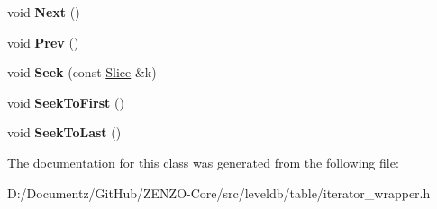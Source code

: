 \begin{DoxyCompactItemize}
\item 
\mbox{\label{classleveldb_1_1_iterator_wrapper_abcd48a4cbd0466c8566f2c12ad8a1038}} 
void {\bfseries Next} ()
\item 
\mbox{\label{classleveldb_1_1_iterator_wrapper_abfd17dc9aef7f4d59603b2edab2ffb77}} 
void {\bfseries Prev} ()
\item 
\mbox{\label{classleveldb_1_1_iterator_wrapper_a5dc3cd4e168e8ec0ab3a094cf36ae5d0}} 
void {\bfseries Seek} (const \mbox{\hyperlink{classleveldb_1_1_slice}{Slice}} \&k)
\item 
\mbox{\label{classleveldb_1_1_iterator_wrapper_a06923cd8c121cf7491cc2b043a479445}} 
void {\bfseries Seek\+To\+First} ()
\item 
\mbox{\label{classleveldb_1_1_iterator_wrapper_ae09179113b28aa3ea1da70b3a7a5f04b}} 
void {\bfseries Seek\+To\+Last} ()
\end{DoxyCompactItemize}


The documentation for this class was generated from the following file\+:\begin{DoxyCompactItemize}
\item 
D\+:/\+Documentz/\+Git\+Hub/\+Z\+E\+N\+Z\+O-\/\+Core/src/leveldb/table/iterator\+\_\+wrapper.\+h\end{DoxyCompactItemize}
